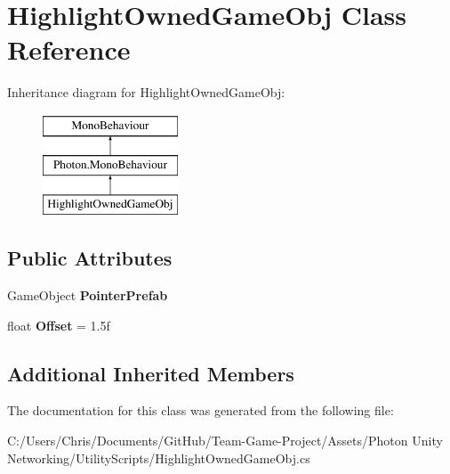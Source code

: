 \hypertarget{class_highlight_owned_game_obj}{}\section{Highlight\+Owned\+Game\+Obj Class Reference}
\label{class_highlight_owned_game_obj}
Inheritance diagram for Highlight\+Owned\+Game\+Obj\+:\begin{figure}[H]
\begin{center}
\leavevmode
\includegraphics[height=3.000000cm]{class_highlight_owned_game_obj}
\end{center}
\end{figure}
\subsection*{Public Attributes}
\begin{DoxyCompactItemize}
\item 
Game\+Object {\bfseries Pointer\+Prefab}\hypertarget{class_highlight_owned_game_obj_ad94db2e57c7b1b7d66dc1744f7571362}{}\label{class_highlight_owned_game_obj_ad94db2e57c7b1b7d66dc1744f7571362}

\item 
float {\bfseries Offset} = 1.\+5f\hypertarget{class_highlight_owned_game_obj_a627640117867653ad7baf37c1b390e33}{}\label{class_highlight_owned_game_obj_a627640117867653ad7baf37c1b390e33}

\end{DoxyCompactItemize}
\subsection*{Additional Inherited Members}


The documentation for this class was generated from the following file\+:\begin{DoxyCompactItemize}
\item 
C\+:/\+Users/\+Chris/\+Documents/\+Git\+Hub/\+Team-\/\+Game-\/\+Project/\+Assets/\+Photon Unity Networking/\+Utility\+Scripts/Highlight\+Owned\+Game\+Obj.\+cs\end{DoxyCompactItemize}
